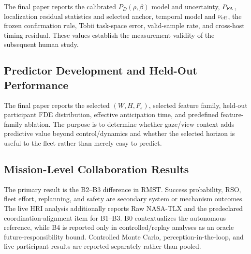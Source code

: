 \documentclass[conference]{IEEEtran}
\begin{document}

The final paper reports the calibrated $P_D(\rho,\beta)$ model and uncertainty,
$P_{\rm FA}$, localization residual statistics and selected anchor, temporal
model and $\nu_{\rm eff}$, the frozen confirmation rule, Tobii task-space error,
valid-sample rate, and cross-host timing residual. These values establish the
measurement validity of the subsequent human study.

\subsection{Predictor Development and Held-Out Performance}


The final paper reports the selected $(W,H,F_s)$, selected feature family,
held-out participant FDE distribution, effective anticipation time, and
predefined feature-family ablation. The purpose is to determine whether gaze/view context adds predictive value
beyond control/dynamics and whether the selected horizon is useful to the fleet
rather than merely easy to predict.

\subsection{Mission-Level Collaboration Results}


The primary result is the B2--B3 difference in RMST. Success probability,
RSO, fleet effort, replanning, and safety are secondary system or mechanism
outcomes. The live HRI analysis additionally reports Raw NASA-TLX and the
predeclared coordination-alignment item for B1--B3. B0 contextualizes the
autonomous reference, while B4 is reported only in controlled/replay analyses
as an oracle future-responsibility bound. Controlled Monte Carlo,
perception-in-the-loop, and live participant results are reported separately
rather than pooled.
\end{document}
